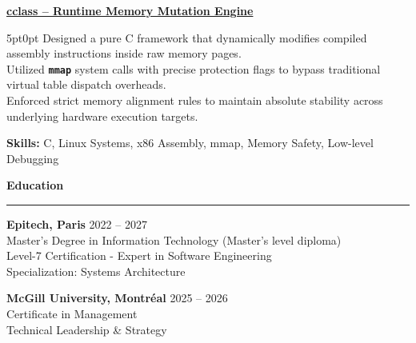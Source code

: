\documentclass[9pt]{extarticle}
\begin{document}
\par\vspace{8pt}

\underline{\bfseries cclass -- Runtime Memory Mutation Engine} %
\par
\begin{adjustwidth}{5pt}{0pt}
    Designed a pure C framework that dynamically modifies compiled assembly instructions inside raw memory pages. \\
    Utilized {\bfseries \texttt{mmap}} system calls with precise protection flags to bypass traditional virtual table dispatch overheads. \\
    Enforced strict memory alignment rules to maintain absolute stability across underlying hardware execution targets.
\end{adjustwidth}
\par
{\bfseries Skills:} C, Linux Systems, x86 Assembly, mmap, Memory Safety, Low-level Debugging

\par\vspace{5pt}

{\large\bfseries Education}
\par\vspace{-8pt}
\rule{\linewidth}{0.4pt}
\par\vspace{5pt}

{\bfseries Epitech, Paris} \hfill 2022 -- 2027 \\ %
Master's Degree in Information Technology (Master's level diploma) \\ %
Level-7 Certification - Expert in Software Engineering \\ %
Specialization: Systems Architecture \\ %

\vspace{4pt}

{\bfseries McGill University, Montréal} \hfill 2025 -- 2026 \\ %
Certificate in Management \\ %
Technical Leadership \& Strategy %
\end{document}
